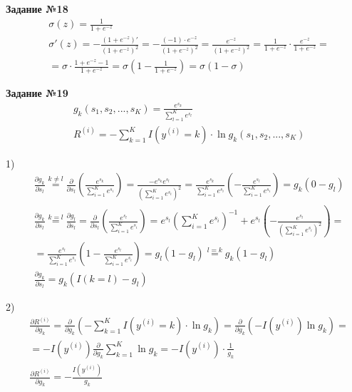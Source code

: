 \documentclass{report}
\begin{document}
\newpage
\par \textbf{Задание №18}
\begin{align*}
& \sigma (z) = \frac{1}{1 + e^{-z}} \\
& \sigma' (z) = - \frac{(1 + e^{-z})'}{(1 + e^{-z})^2} = - \frac{(-1) \cdot e^{-z}}{(1 + e^{-z})^2} = \frac{e^{-z}}{(1 + e^{-z})^2} = \frac{1}{1 + e^{-z}} \cdot \frac{e^{-z}}{1 + e^{-z}} = \\
& = \sigma \cdot \frac{1 + e^{-z} - 1}{1 + e^{-z}} = \sigma \left( 1 - \frac{1}{1 + e^{-z}} \right) = \sigma (1 - \sigma)
\end{align*}

\par \textbf{Задание №19}
\begin{align*}
& g_k (s_1, s_2, ..., s_K) = \frac{e^{s_k}}{\sum_{l=1}^{K} e^{s_l}} \\
& R^{(i)} = - \sum_{k=1}^{K} I(y^{(i)} = k) \cdot \ln g_k (s_1, s_2, ..., s_K)
\end{align*}

\par 1)
\begin{align*}
& \frac{\partial g_k}{\partial s_l} \overset{k \neq l}{=} \frac{\partial}{\partial s_l} \left( \frac{e^{s_k}}{\sum_{i=1}^{K} e^{s_i}} \right) = \frac{- e^{s_k} e^{s_l}}{(\sum_{i=1}^{K} e^{s_i})^2} = \frac{e^{s_k}}{\sum_{i=1}^{K} e^{s_i}} \left( - \frac{e^{s_l}}{\sum_{i=1}^{K} e^{s_i}} \right) = g_k (0 - g_l) \\
& \frac{\partial g_k}{\partial s_l} \overset{k = l}{=} \frac{\partial g_l}{\partial s_l} = \frac{\partial}{\partial s_l} \left( \frac{e^{s_l}}{\sum_{i=1}^{K} e^{s_i}} \right) = e^{s_l} \left( \sum_{i=1}^{K} e^{s_i} \right) ^{-1} + e^{s_l} \left( - \frac{e^{s_l}}{(\sum_{i=1}^{K} e^{s_i})^2} \right) = \\
& = \frac{e^{s_l}}{\sum_{i=1}^{K} e^{s_i}} \left( 1 - \frac{e^{s_l}}{\sum_{i=1}^{K} e^{s_i}} \right) = g_l (1 - g_l) \overset{l = k}{=} g_k (1 - g_l) \\
& \frac{\partial g_k}{\partial s_l} = g_k (I(k = l) - g_l)
\end{align*}

\par 2)
\begin{align*}
& \frac{\partial R^{(i)}}{\partial g_k} = \frac{\partial}{\partial g_k} \left( -  \sum_{k=1}^{K} I(y^{(i)} = k) \cdot \ln g_k \right) = \frac{\partial}{\partial g_k} (-I(y^{(i)}) \ln g_k) = \\
& = -I(y^{(i)}) \frac{\partial}{\partial g_k} \sum_{k=1}^{K} \ln g_k = -I(y^{(i)}) \cdot \frac{1}{g_k} \\
& \frac{\partial R^{(i)}}{\partial g_k} = - \frac{I(y^{(i)})}{g_k}
\end{align*}
\end{document}
